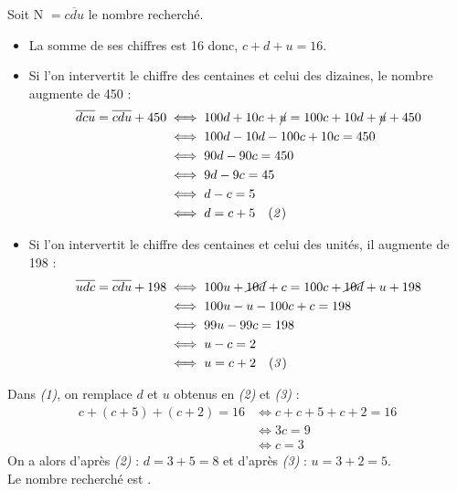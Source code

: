    Soit N $=\overline{cdu}$ le nombre recherché.
   \begin{itemize}
      \item La somme de ses chiffres est 16 donc, $c+d+u =16$.  \\
      \item Si l'on intervertit le chiffre des centaines et celui des dizaines, le nombre augmente de 450 :
      \begin{align*}
         \overline{dcu} =\overline{cdu}+450 & \iff 100d+10c+\cancel{u} =100c+10d+\cancel{u}+450 \\
         & \iff 100d-10d-100c+10c =450 \\
         & \iff 90d-90c=450 \\
         & \iff 9d-9c =45 \\
         & \iff d-c =5 \\
         & \iff d=c+5 \quad {\it (2)}
      \end{align*}
      \item Si l'on intervertit le chiffre des centaines et celui des unités, il augmente de 198 :
      \begin{align*}
         \overline{udc} =\overline{cdu}+198 & \iff 100u+\cancel{10d}+c =100c+\cancel{10d}+u+198 \\
         & \iff 100u-u-100c+c =198 \\
         & \iff 99u-99c =198 \\
         & \iff u-c =2 \\
         & \iff u =c+2 \quad {\it (3)}
      \end{align*}
   \end{itemize}
   Dans {\it (1)}, on remplace $d$ et $u$ obtenus en {\it (2)} et {\it (3)} :
   \begin{align*}
   c+(c+5)+(c+2)=16 & \Longleftrightarrow c+c+5+c+2=16 \\
   & \Longleftrightarrow 3c=9 \\
   & \Longleftrightarrow c=3
   \end{align*}
   On a alors d'après {\it (2)} : $d=3+5=8$ et d'après {\it (3)} : $u=3+2=5$. \\
   Le nombre recherché est .
